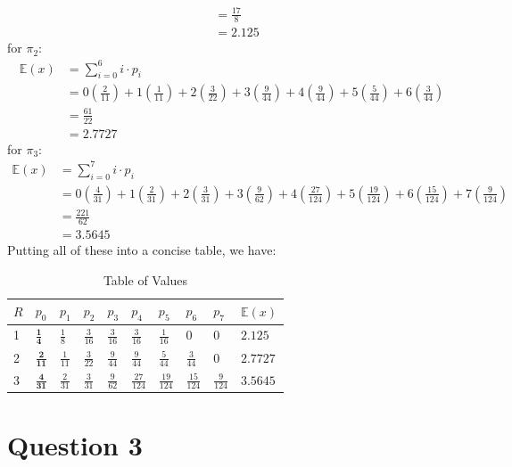 \documentclass[12pt]{article}
\begin{document}
\begin{align*}
    &= \frac{17}{8} \\ 
    &= 2.125
\end{align*} for $\pi_2$: \begin{align*}
    \mathbb{E}(x) &= \sum_{i=0}^{6} i\cdot p_i \\ 
    &= 0\left( \frac{2}{11} \right) + 1\left( \frac{1}{11} \right) + 2\left( \frac{3}{22} \right) + 3\left( \frac{9}{44} \right) + 4\left( \frac{9}{44} \right) + 5\left( \frac{5}{44} \right) + 6\left( \frac{3}{44} \right)\\ 
    &= \frac{61}{22} \\ 
    &= 2.7727
\end{align*} for $\pi_3$: \begin{align*}
    \mathbb{E}(x) &= \sum_{i=0}^{7} i\cdot p_i \\ 
    &= 0\left( \frac{4}{31} \right) + 1\left( \frac{2}{31} \right) + 2\left( \frac{3}{31} \right) + 3\left( \frac{9}{62} \right) + 4\left( \frac{27}{124} \right) + 5\left( \frac{19}{124} \right) + 6\left( \frac{15}{124} \right)+ 7\left( \frac{9}{124} \right)\\ 
    &= \frac{221}{62} \\ 
    &= 3.5645
\end{align*} Putting all of these into a concise table, we have: \begin{table}[H]
    \centering
    \begin{tabular}{l|l|lllllll | l}
        \toprule 
        $R$ & $p_{0}$ & $p_{1}$ &$p_{2}$ &$p_{3}$ &$p_{4}$ &$p_{5}$ &$p_{6}$ &$p_{7}$ & $ \mathbb{E}(x)$ \\ \midrule 
        1 & $\mathbf{\frac{1}{4}}$& $\frac{1}{8}$& $\frac{3}{16}$& $\frac{3}{16}$& $\frac{3}{16}$& $\frac{1}{16}$& $0$& $0$ & $\mathbf{2.125}$ \\ [6pt]
        2 & $\mathbf{\frac{2}{11}}$& $\frac{1}{11}$& $\frac{3}{22}$& $\frac{9}{44}$& $\frac{9}{44}$& $\frac{5}{44}$& $\frac{3}{44}$& $0$ & $\mathbf{2.7727}$ \\ [6pt]
        3 & $\mathbf{\frac{4}{31}}$& $\frac{2}{31}$& $\frac{3}{31}$& $\frac{9}{62}$& $\frac{27}{124}$& $\frac{19}{124}$& $\frac{15}{124}$& $\frac{9}{124}$ & $\mathbf{3.5645}$ \\ [6pt] \bottomrule
    \end{tabular}
    \caption{Table of Values}
    \label{1-tabvalues}
\end{table}

\section*{Question 3}
\end{document}
